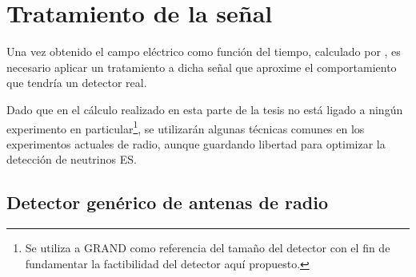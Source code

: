 \section{Tratamiento de la se\~nal}
\label{sbsc:sig_treat}
	
	Una vez obtenido el campo el\'ectrico como funci\'on del tiempo, calculado por \zhs{}, es necesario aplicar un tratamiento a dicha se\~nal que aproxime el comportamiento que tendr\'ia un detector real.
	
	Dado que en el c\'alculo realizado en esta parte de la tesis no est\'a ligado a ning\'un experimento en particular\footnote{Se utiliza a GRAND como referencia del tama\~no del detector con el fin de fundamentar la factibilidad del detector aqu\'i propuesto.}, se utilizar\'an algunas t\'ecnicas comunes en los experimentos actuales de radio, aunque guardando libertad para optimizar la detecci\'on de neutrinos ES.
	
	
	\subsection{Detector gen\'erico de antenas de radio}
	
